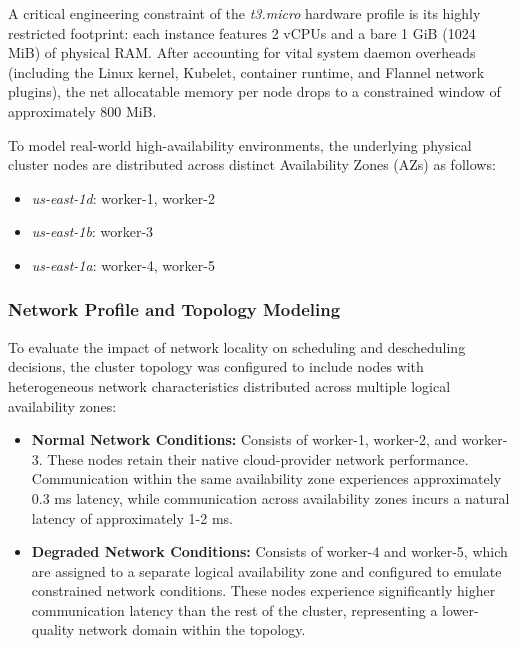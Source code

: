 A critical engineering constraint of the \textit{t3.micro} hardware profile is its highly restricted footprint: each instance features 2 vCPUs and a bare 1 GiB (1024 MiB) of physical RAM. After accounting for vital system daemon overheads (including the Linux kernel, Kubelet, container runtime, and Flannel network plugins), the net allocatable memory per node drops to a constrained window of approximately 800 MiB.  

To model real-world high-availability environments, the underlying physical cluster nodes are distributed across distinct Availability Zones (AZs) as follows:  

\begin{itemize}
    \item \textit{us-east-1d}: worker-1, worker-2
    \item \textit{us-east-1b}: worker-3
    \item \textit{us-east-1a}: worker-4, worker-5
\end{itemize}

\subsubsection{Network Profile and Topology Modeling}
\label{subsubsec:netaware4_networksetup}
To evaluate the impact of network locality on scheduling and descheduling decisions, the cluster topology was configured to include nodes with heterogeneous network characteristics distributed across multiple logical availability zones:

\begin{itemize}
    \item \textbf{Normal Network Conditions:} Consists of worker-1, worker-2, and worker-3. These nodes retain their native cloud-provider network performance. Communication within the same availability zone experiences approximately 0.3 ms latency, while communication across availability zones incurs a natural latency of approximately 1-2 ms.

    \item \textbf{Degraded Network Conditions:} Consists of worker-4 and worker-5, which are assigned to a separate logical availability zone and configured to emulate constrained network conditions. These nodes experience significantly higher communication latency than the rest of the cluster, representing a lower-quality network domain within the topology.
\end{itemize}

